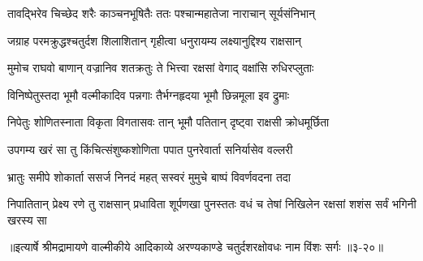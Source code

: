 \twolineshloka
{तावद्भिरेव चिच्छेद शरैः काञ्चनभूषितैः}
{ततः पश्चान्महातेजा नाराचान् सूर्यसंनिभान्} %

\twolineshloka
{जग्राह परमक्रुद्धश्चतुर्दश शिलाशितान्}
{गृहीत्वा धनुरायम्य लक्ष्यानुद्दिश्य राक्षसान्} %

\twolineshloka
{मुमोच राघवो बाणान् वज्रानिव शतक्रतुः}
{ते भित्त्वा रक्षसां वेगाद् वक्षांसि रुधिरप्लुताः} %

\twolineshloka
{विनिष्पेतुस्तदा भूमौ वल्मीकादिव पन्नगाः}
{तैर्भग्नहृदया भूमौ छिन्नमूला इव द्रुमाः} %

\twolineshloka
{निपेतुः शोणितस्नाता विकृता विगतासवः}
{तान् भूमौ पतितान् दृष्ट्वा राक्षसी क्रोधमूर्छिता} %

\twolineshloka
{उपगम्य खरं सा तु किंचित्संशुष्कशोणिता}
{पपात पुनरेवार्ता सनिर्यासेव वल्लरी} %

\twolineshloka
{भ्रातुः समीपे शोकार्ता ससर्ज निनदं महत्}
{सस्वरं मुमुचे बाष्पं विवर्णवदना तदा} %

\twolineshloka
{निपातितान् प्रेक्ष्य रणे तु राक्षसान् प्रधाविता शूर्पणखा पुनस्ततः}
{वधं च तेषां निखिलेन रक्षसां शशंस सर्वं भगिनी खरस्य सा} %


॥इत्यार्षे श्रीमद्रामायणे वाल्मीकीये आदिकाव्ये अरण्यकाण्डे चतुर्दशरक्षोवधः नाम विंशः सर्गः ॥३-२०॥
